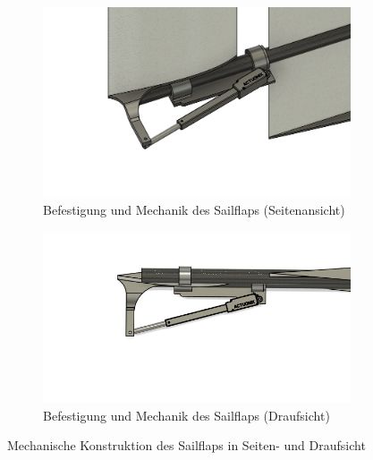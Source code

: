 \begin{figure}[H]
    \centering
    \begin{subfigure}[b]{0.48\linewidth}
        \centering
        \includegraphics[width=\linewidth]{assets/sail_mechanics.png}
        \caption{Befestigung und Mechanik des Sailflaps (Seitenansicht)}
        \label{fig:sailmechanics}
    \end{subfigure}
    \hfill
    \begin{subfigure}[b]{0.48\linewidth}
        \centering
        \includegraphics[width=\linewidth]{assets/salimech_top.png}
        \caption{Befestigung und Mechanik des Sailflaps (Draufsicht)}
        \label{fig:sailmechanics_top}
    \end{subfigure}
    \caption{Mechanische Konstruktion des Sailflaps in Seiten- und Draufsicht}
    \label{fig:sail_mechanics_multiview}
\end{figure}


